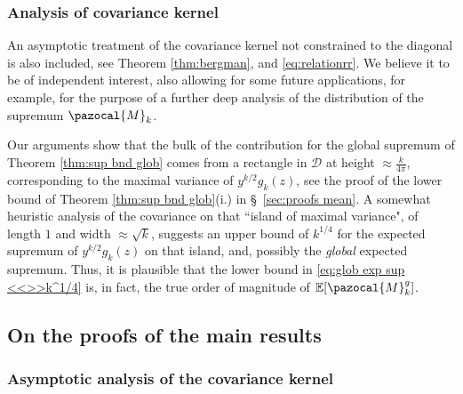 \documentclass[12pt, a4paper]{amsart}
\theoremstyle{definition}
\newcommand {\E} {\mathbb{E}}
\newcommand {\1} {\mathbf{1}}
\newcommand {\M} {\pazocal {M}}
\newcommand {\Dc} {\mathcal{D}}
\numberwithin{equation}{section}
\begin{document}
\subsubsection{Analysis of covariance kernel}

An asymptotic treatment of the covariance kernel not constrained to the diagonal is also included, see Theorem \ref{thm:bergman}, and \eqref{eq:relationrr}. 
We believe it to be of independent interest, also allowing for some future applications, for example, for the purpose of a further deep analysis of the distribution of the supremum $\M_{k}$.

\vspace{2mm}

Our arguments show that the bulk of the contribution for the global supremum of Theorem \ref{thm:sup bnd glob} comes from a rectangle in $\Dc$ at height $\approx \frac{k}{4\pi}$, corresponding
to the maximal variance of $y^{k/2}g_{k}(z)$, see the proof of the lower bound of Theorem \ref{thm:sup bnd glob}(i.) in \S~\ref{sec:proofs mean}.
A somewhat heuristic analysis of the covariance on that ``island of maximal variance", of length $1$ and width $\approx \sqrt{k}$, suggests an upper bound of $k^{1/4}$ for 
the expected supremum of $y^{k/2}g_{k}(z)$ on that island, and, possibly the {\em global} expected supremum. Thus, it is plausible that the lower bound in \eqref{eq:glob exp sup <<>>k^1/4} 
is, in fact, the true order of magnitude of $\E[\M_{k}^{g}]$.


\subsection{On the proofs of the main results}


\subsubsection{{\bf Asymptotic analysis of the covariance kernel}}
\end{document}

